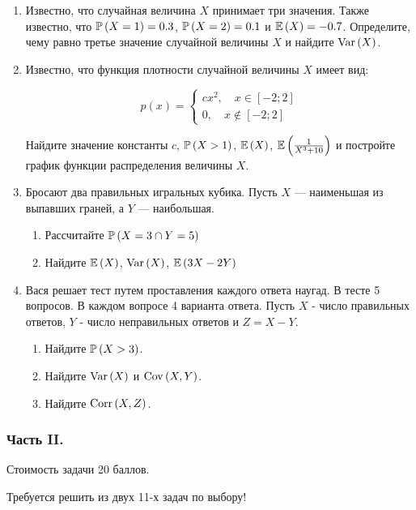 \begin{enumerate}
\item Известно, что случайная величина  $X$  принимает три значения. Также известно,
что  $\P\left(X=1\right)=0.3$, $\P\left(X=2\right)=0.1$ и $\E\left(X\right) = -0.7$.
Определите, чему равно третье значение случайной величины $X$ и найдите
$\Var\left(X\right)$.

\item Известно, что функция плотности случайной величины  $X$  имеет вид:

\[
p\left(x\right) = \begin{cases}
cx^{2} , \quad x\in [-2;2] \\
0,\quad x\notin [-2;2]
\end{cases}
\]

Найдите значение константы $c$, $\P\left(X>1\right)$, $\E\left(X\right)$,
$\E\left(\frac{1}{X^{3} +10} \right)$ и постройте график функции распределения
величины $X$.

\item Бросают два правильных игральных кубика. Пусть  $X$  — наименьшая из выпавших
граней, а $Y$ — наибольшая.
\begin{enumerate}
\item Рассчитайте  $\P\left(X=3\cap Y=5\right)$
\item Найдите  $\E\left(X\right)$, $\Var\left(X\right)$, $\E\left(3X-2Y\right)$
\end{enumerate}

\item Вася решает тест путем проставления каждого ответа наугад. В тесте 5 вопросов.
В каждом вопросе 4 варианта ответа. Пусть  $X$  - число правильных ответов, $Y$ -
число неправильных ответов и $Z = X - Y$.
\begin{enumerate}
\item Найдите $\P\left(X > 3\right)$.
\item Найдите $\Var\left(X\right)$ и $\Cov\left(X, Y\right)$.
\item Найдите $\Corr\left(X,Z\right)$.
\end{enumerate}
\end{enumerate}

\subsubsection*{Часть II.}

Стоимость задачи 20 баллов.

Требуется решить {\bf {}} из двух 11-х задач по выбору!

